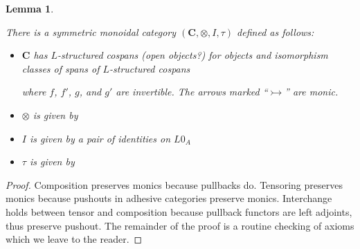 \documentclass{amsart}
\newcommand{\A}{\cat{A}}
\newcommand{\C}{\cat{C}}
\newcommand{\X}{\cat{X}}
\newcommand{\cat}[1]{\mathbf{#1}}
\newcommand{\diagram}[1]{\raisebox{-0.5\height}{\texttt{[image: \#1]}}}
\newcommand{\MMonRewrite}{ \mathbb{M}\mathbf{on}\mathbb{R}\mathbf{ewrite} }
\newcommand{\edit}[1]{\textcolor{editcolour}{(#1)}}
\newtheorem{lemma}[theorem]{Lemma}
\theoremstyle{remark}
\theoremstyle{definition}
\begin{document}
\begin{lemma}
  \label{thm:mon-rewrite-arrcat}
  
   There is a symmetric monoidal category
  $ ( \C , \otimes , I , \tau ) $ defined as follows:
  \begin{itemize}
   \item $ \C $ has $ L $-structured cospans \edit{open objects?}
          for objects and isomorphism classes of spans of
          $ L $-structured cospans
          \begin{center}
            \diagram{diag_lr_dbl-mon-rewrite-2cell}
          \end{center}
          where $ f $, $ f' $, $ g $, and $ g' $ are invertible. The
          arrows marked ``$ \rightarrowtail $'' are monic.
   \item $ \otimes $ is given by
         \begin{center}
           \diagram{diag_lr_dbl-rewrite-tensor}
         \end{center}
   \item $ I $ is given by a pair of identities on $ L0_A $
   \item $ \tau $ is given by
        \begin{center}
          \diagram{diag_lr_dbl-rewrite-braiding}
        \end{center}
   \end{itemize}
\end{lemma}

\begin{proof}
  
  Composition preserves monics because pullbacks do. Tensoring
  preserves monics because pushouts in adhesive categories preserve
  monics. Interchange holds between tensor and composition because
  pullback functors are left adjoints, thus preserve pushout. The
  remainder of the proof is a routine checking of axioms which we
  leave to the reader.
 
\end{proof}

\end{document}

